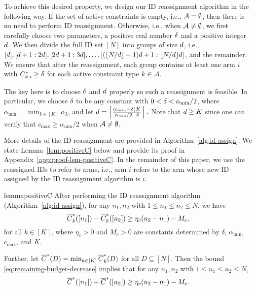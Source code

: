 \documentclass[11pt,letterpaper]{article}
\begin{document}
To achieve this desired property, we design our ID reassignment algorithm in the following way.
If the set of active constraints is empty, i.e., $\mathcal{A}=\emptyset$, then there is no need to perform ID reassignment.
Otherwise, i.e., when $\mathcal{A}\neq \emptyset$, we first carefully choose two parameters, a positive real number $\delta$ and a positive integer $d$.
We then divide the full ID set $[N]$ into groups of size $d$, i.e., $[d],[d+1:2d],[2d+1:3d],\dots,[(\lfloor N/d\rfloor-1)d+1: \lfloor N/d\rfloor d]$, and the remainder.
We ensure that after the reassignment, each group contains at least one arm $i$ with $C_{k,i}^*\ge \delta$ for each active constraint type $k\in\mathcal{A}$.


The key here is to choose $\delta$ and $d$ properly so such a reassignment is feasible.
In particular, we choose $\delta$ to be any constant with $0<\delta<\alpha_{\min}/2$, where $\alpha_{\min}=\min_{k\in[K]}\alpha_k$, and let
$d = \left\lceil \frac{(c_{\max}-\delta)K}{\alpha_{\min}/2-\delta}\right\rceil.$
Note that $d\ge K$ since one can verify that $c_{\max}\ge \alpha_{\min}/2$ when $\mathcal{A}\neq \emptyset$. 

More details of the ID reassignment are provided in Algorithm~\ref{alg:id-assign}.
We state Lemma~\ref{lem:positiveC} below and provide its proof in Appendix~\ref{app:proof-lem-positiveC}.
In the remainder of this paper, we use the reassigned IDs to refer to arms, i.e., arm $i$ refers to the arm whose new ID assigned by the ID reassignment algorithm is $i$.

\begin{restatable}{lemma}{positiveC}\label{lem:positiveC}
After performing the ID reassignment algorithm (Algorithm~\ref{alg:id-assign}), for any $n_1,n_2$ with $1\le n_1\le n_2\le N$, we have
\begin{equation}\label{eq:remaining-budget-decrease}
    \overline{C}^*_k([n_1])-\overline{C}^*_k([n_2])\ge \eta_c(n_2-n_1)-M_c,
\end{equation}
for all $k\in[K]$,
where $\eta_c>0$ and $M_c>0$ are constants determined by $\delta$, $\alpha_{\min}$, $c_{\max}$, and $K$.

Further, let $\overline{C}^*(D)=\min_{k\in[K]}\overline{C}^*_k(D)$ for all $D\subseteq [N]$.  Then the bound \eqref{eq:remaining-budget-decrease} implies that for any $n_1,n_2$ with $1\le n_1\le n_2\le N$,
\begin{equation}
    \overline{C}^*([n_1])-\overline{C}^*([n_2])\ge \eta_c(n_2-n_1)-M_c.
\end{equation}
\end{restatable}
\end{document}
